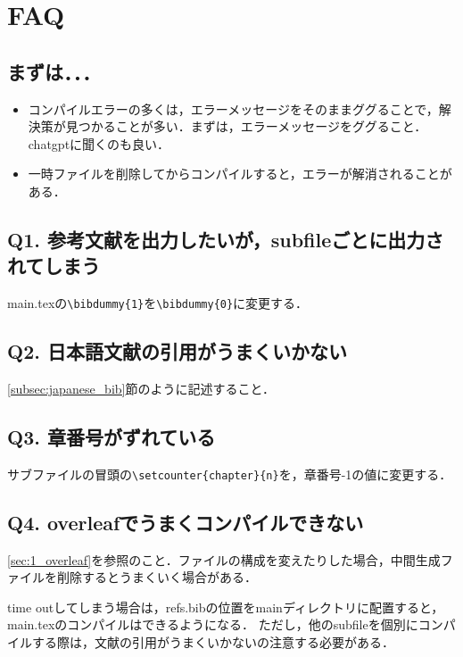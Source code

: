 \documentclass[../main/main]{subfiles}
\begin{document}
\chapter{FAQ}
\section*{まずは．．．}
  \begin{itemize}
    \item コンパイルエラーの多くは，エラーメッセージをそのままググることで，解決策が見つかることが多い．まずは，エラーメッセージをググること．chatgptに聞くのも良い．
    \item 一時ファイルを削除してからコンパイルすると，エラーが解消されることがある．
  \end{itemize}

\section*{Q1. 参考文献を出力したいが，subfileごとに出力されてしまう}
main.texの\verb|\bibdummy{1}|を\verb|\bibdummy{0}|に変更する．

\section*{Q2. 日本語文献の引用がうまくいかない}
\ref{subsec:japanese_bib}節のように記述すること．

\section*{Q3. 章番号がずれている}
サブファイルの冒頭の\verb|\setcounter{chapter}{n}|を，章番号-1の値に変更する．


\section*{Q4. overleafでうまくコンパイルできない}
\cref{sec:1_overleaf}を参照のこと．ファイルの構成を変えたりした場合，中間生成ファイルを削除するとうまくいく場合がある．
\par
time outしてしまう場合は，refs.bibの位置をmainディレクトリに配置すると，main.texのコンパイルはできるようになる．
ただし，他のsubfileを個別にコンパイルする際は，文献の引用がうまくいかないの注意する必要がある．

\end{document}
